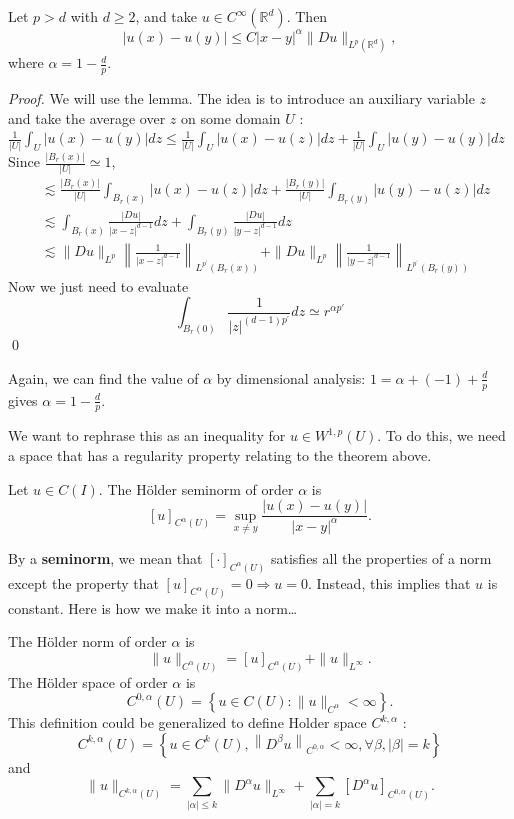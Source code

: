 \begin{theorem}
Let $p>d$ with $d \geq 2$, and take $u \in C^{\infty}\left(\mathbb{R}^{d}\right)$. Then
$$
|u(x)-u(y)| \leq C|x-y|^{\alpha}\|D u\|_{L^{p}\left(\mathbb{R}^{d}\right)},
$$
where $\alpha=1-\frac{d}{p}$.
\end{theorem}
\begin{proof}
    We will use the lemma. The idea is to introduce an auxiliary variable $z$ and take the average over $z$ on some domain $U$ :
    $\frac{1}{|U|} \int_{U}|u(x)-u(y)| d z \leq \frac{1}{|U|} \int_{U}|u(x)-u(z)| d z+\frac{1}{|U|} \int_{U}|u(y)-u(y)| d z$
    Since $\frac{\left|B_{r}(x)\right|}{|U|} \simeq 1$,
    $$
    \begin{aligned}
    &\lesssim \frac{\left|B_{r}(x)\right|}{|U|} \int_{B_{r}(x)}|u(x)-u(z)| d z+\frac{\left|B_{r}(y)\right|}{|U|} \int_{B_{r}(y)}|u(y)-u(z)| d z \\
    &\lesssim \int_{B_{r}(x)} \frac{|D u|}{|x-z|^{d-1}} d z+\int_{B_{r}(y)} \frac{|D u|}{|y-z|^{d-1}} d z \\
    &\lesssim\|D u\|_{L^{p}}\left\|\frac{1}{|x-z|^{d-1}}\right\|_{L^{p^{\prime}}\left(B_{r}(x)\right)}+\|D u\|_{L^{p}}\left\|\frac{1}{|y-z|^{d-1}}\right\|_{L^{p^{\prime}}\left(B_{r}(y)\right)}
    \end{aligned}
    $$
    Now we just need to evaluate
    $$
    \int_{B_{r}(0)} \frac{1}{|z|^{(d-1) p^{\prime}}} d z \simeq r^{\alpha p'}
    $$
    \qed 
\end{proof}

 \begin{remark}
    Again, we can find the value of $\alpha$ by dimensional analysis: $1=\alpha+(-1)+\frac{d}{p}$ gives $\alpha=1-\frac{d}{p}$.
 \end{remark}
 We want to rephrase this as an inequality for $u \in W^{1, p}(U)$. To do this, we need a space that has a regularity property relating to the theorem above.

 \begin{definition}
Let $u \in C(I)$. The Hölder seminorm of order $\alpha$ is
$$
[u]_{C^{\alpha}(U)}=\sup _{x \neq y} \frac{|u(x)-u(y)|}{|x-y|^{\alpha}} .
$$
 \end{definition}
 By a \textbf{seminorm}, we mean that $[\cdot]_{C^{\alpha}(U)}$ satisfies all the properties of a norm except the property that $[u]_{C^{\alpha}(U)}=0 \Longrightarrow u=0$. Instead, this implies that $u$ is constant. Here is how we make it into a norm\dots
 
 \begin{definition}
The H\"older norm of order $\alpha$ is
$$
\|u\|_{C^{\alpha}(U)}=[u]_{C^{\alpha}(U)}+\|u\|_{L^{\infty}} .
$$
The H\"older space of order $\alpha$ is
$$
C^{0,\alpha}(U)=\left\{u \in C(U):\|u\|_{C^{\alpha}}<\infty\right\} .
$$
This definition could be generalized to define Holder space $C^{k, \alpha}$ :
$$
C^{k, \alpha}(U)=\left\{u \in C^{k}(U),\left\|D^{\beta} u\right\|_{C^{0, \alpha}}<\infty, \forall \beta,|\beta|=k\right\}
$$
and 
\[
    \|u\|_{C^{k,\alpha}(U)} = \sum_{|\alpha| \le k} \|D^\alpha u\|_{L^\infty} + \sum_{|\alpha|=k} [D^\alpha u]_{C^{0,\alpha}(U)}.
\]
 \end{definition}

